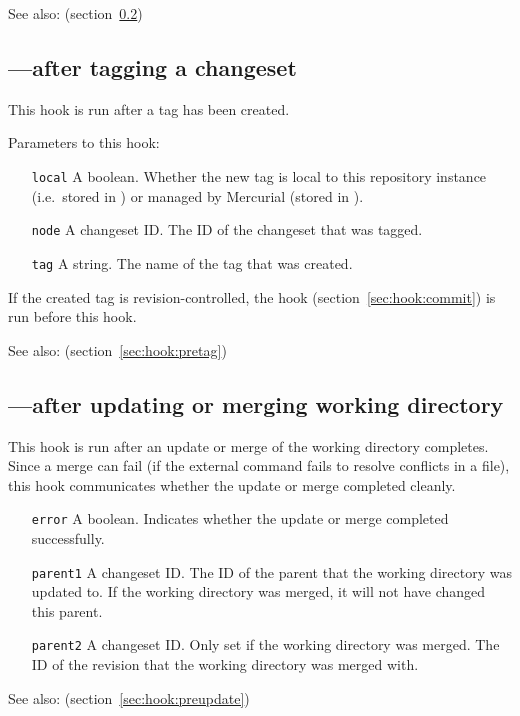 See also:  (section~\ref{sec:hook:update})

\subsection{---after tagging a changeset}
\label{sec:hook:tag}

This hook is run after a tag has been created.

Parameters to this hook:
\begin{itemize}
\item[\texttt{local}] A boolean.  Whether the new tag is local to this
  repository instance (i.e.~stored in ) or
  managed by Mercurial (stored in ).
\item[\texttt{node}] A changeset ID.  The ID of the changeset that was
  tagged.
\item[\texttt{tag}] A string.  The name of the tag that was created.
\end{itemize}

If the created tag is revision-controlled, the  hook
(section~\ref{sec:hook:commit}) is run before this hook.

See also:  (section~\ref{sec:hook:pretag})

\subsection{---after updating or merging working directory}
\label{sec:hook:update}

This hook is run after an update or merge of the working directory
completes.  Since a merge can fail (if the external 
command fails to resolve conflicts in a file), this hook communicates
whether the update or merge completed cleanly.

\begin{itemize}
\item[\texttt{error}] A boolean.  Indicates whether the update or
  merge completed successfully.
\item[\texttt{parent1}] A changeset ID.  The ID of the parent that the
  working directory was updated to.  If the working directory was
  merged, it will not have changed this parent.
\item[\texttt{parent2}] A changeset ID.  Only set if the working
  directory was merged.  The ID of the revision that the working
  directory was merged with.
\end{itemize}

See also:  (section~\ref{sec:hook:preupdate})

